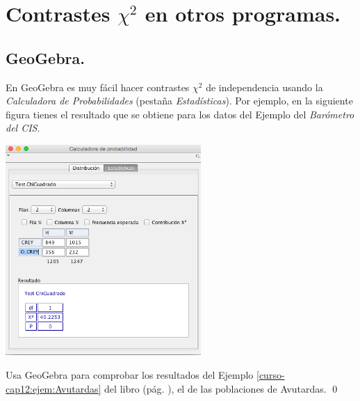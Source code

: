 \documentclass[10pt,a4paper]{article}\usepackage[]{graphicx}\usepackage[]{color}
\newcounter {cont01}
\begin{document}
\section{Contrastes  $\chi^2$ en otros programas.}
\label{tut12:sec:ContrasteChiCuadradoOtrosProgramas}

\subsection{GeoGebra.}

En GeoGebra es muy fácil hacer contrastes $\chi^2$ de independencia usando la {\em Calculadora de Probabilidades} (pestaña {\em Estadísticas}). Por ejemplo, en la siguiente figura tienes el resultado que se obtiene para los datos del Ejemplo del {\em Barómetro del CIS}.

\begin{center}
    \includegraphics[height=8cm]{../fig/Tut12-GeoGebraChiCuadradoIndependencia.png}
\end{center}


\begin{ejercicio}
\label{tut12:ejercicio05}
Usa GeoGebra para comprobar los resultados del Ejemplo \ref{curso-cap12:ejem:Avutardas} del libro (pág. \pageref{curso-cap12:ejem:Avutardas}), el de las poblaciones de Avutardas.
\qed
\end{ejercicio}
\end{document}
